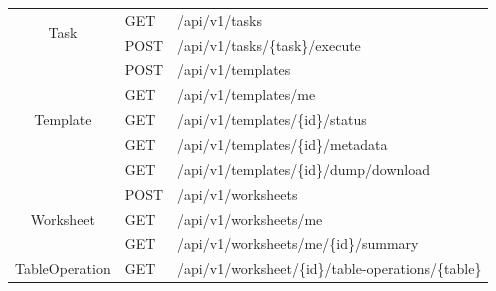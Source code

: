 \documentclass[a4paper,twoside,12pt]{book}
\begin{document}
\begin{table}[]
\begin{tabular}{|c|l|l|}
\multicolumn{1}{|c|}{\multirow{2}{*}{Task}}                        & \multicolumn{1}{l|}{GET}            & /api/v1/tasks \\
\multicolumn{1}{|c|}{}                                             & \multicolumn{1}{l|}{POST}           & /api/v1/tasks/\{task\}/execute \\ \hline

\multicolumn{1}{|c|}{\multirow{5}{*}{Template}}                    & \multicolumn{1}{l|}{POST}           & /api/v1/templates  \\
\multicolumn{1}{|c|}{}                                             & \multicolumn{1}{l|}{GET}            & /api/v1/templates/me \\
\multicolumn{1}{|c|}{}                                             & \multicolumn{1}{l|}{GET}            & /api/v1/templates/\{id\}/status \\  
\multicolumn{1}{|c|}{}                                             & \multicolumn{1}{l|}{GET}            & /api/v1/templates/\{id\}/metadata \\ 
\multicolumn{1}{|c|}{}                                             & \multicolumn{1}{l|}{GET}            & /api/v1/templates/\{id\}/dump/download \\ \hline

\multicolumn{1}{|c|}{\multirow{3}{*}{Worksheet}}                   & \multicolumn{1}{l|}{POST}           & /api/v1/worksheets  \\
\multicolumn{1}{|c|}{}                                             & \multicolumn{1}{l|}{GET}            & /api/v1/worksheets/me \\
\multicolumn{1}{|c|}{}                                             & \multicolumn{1}{l|}{GET}            & /api/v1/worksheets/me/\{id\}/summary \\  \hline

\multicolumn{1}{|c|}{TableOperation}                               & \multicolumn{1}{l|}{GET}            & /api/v1/worksheet/\{id\}/table-operations/\{table\}  \\ \hline


\end{tabular}
\end{table}
\end{document}
